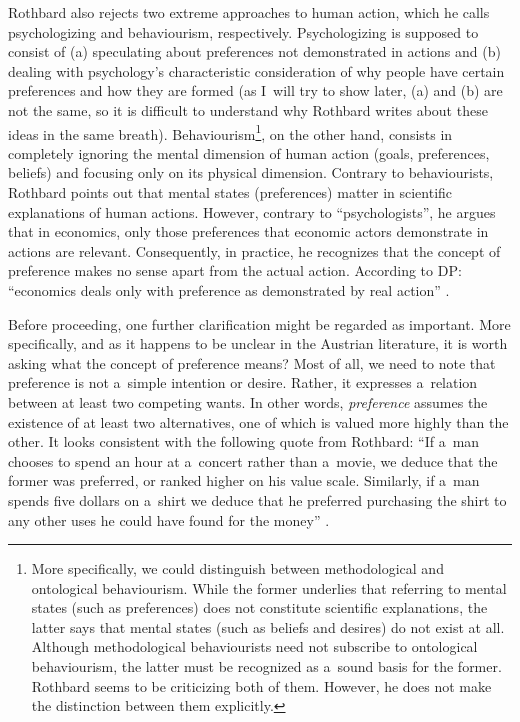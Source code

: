 Rothbard also rejects two extreme approaches to human action, which he calls psychologizing and behaviourism, respectively. Psychologizing is supposed to consist of (a) speculating about preferences not demonstrated in actions and (b) dealing with psychology's characteristic consideration of why people have certain preferences and how they are formed (as I~will try to show later, (a) and (b) are not the same, so it is difficult to understand why Rothbard writes about these ideas in the same breath). Behaviourism\footnote{More specifically, we could distinguish between methodological and ontological behaviourism. While the former underlies that referring to mental states (such as preferences) does not constitute scientific explanations, the latter says that mental states (such as beliefs and desires) do not exist at all. Although methodological behaviourists need not subscribe to ontological behaviourism, the latter must be recognized as a~sound basis for the former. Rothbard 
\parencite*[][p.297]{rothbard_present_2011} %
 seems to be criticizing both of them. However, he does not make the distinction between them explicitly.}, on the other hand, consists in completely ignoring the mental dimension of human action (goals, preferences, beliefs) and focusing only on its physical dimension. Contrary to behaviourists, Rothbard points out that mental states (preferences) matter in scientific explanations of human actions. However, contrary to ``psychologists'', he argues that in economics, only those preferences that economic actors demonstrate in actions are relevant. Consequently, in practice, he recognizes that the concept of preference makes no sense apart from the actual action. According to DP: ``economics deals only with preference as demonstrated by real action'' 
\parencite[][p.333]{rothbard_present_2011}.%




Before proceeding, one further clarification might be regarded as important. More specifically, and as it happens to be unclear in the Austrian literature, it is worth asking what the concept of preference means? Most of all, we need to note that preference is not a~simple intention or desire. Rather, it expresses a~relation between at least two competing wants. In other words, \textit{preference} assumes the existence of at least two alternatives, one of which is valued more highly than the other. It looks consistent with the following quote from Rothbard: ``If a~man chooses to spend an hour at a~concert rather than a~movie, we deduce that the former was preferred, or ranked higher on his value scale. Similarly, if a~man spends five dollars on a~shirt we deduce that he preferred purchasing the shirt to any other uses he could have found for the money'' 
\parencite[][p.290]{rothbard_present_2011}.%




